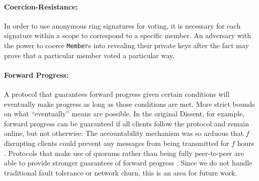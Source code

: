   \paragraph{Coercion-Resistance:} In order to use anonymous ring signatures for
  voting, it is necessary for each signature within a scope to correspond to a
  specific member. An adversary with the power to coerce \texttt{Member}s into
  revealing their private keys after the fact may prove that a particular member
  voted a particular way\cite{lrs}.
%
  \paragraph{Forward Progress:} A protocol that guarantees forward progress
  given certain conditions will eventually make progress as long as those
  conditions are met. More strict bounds on what ``eventually'' means are
  possible. In the original Dissent, for example, forward progress can be
  guaranteed if all clients follow the protocol and remain online, but not
  otherwise: The accountability mechanism was so arduous that $f$ disrupting
  clients could prevent any messages from being transmitted for $f$ hours
  \cite{verdict}. Protocols that make use of quorums rather than being fully
  peer-to-peer are able to provide stronger guarantees of forward progress
  \cite{paxos}. Since we do not handle traditional fault tolerance or network
  churn,  this is an area for future work.
